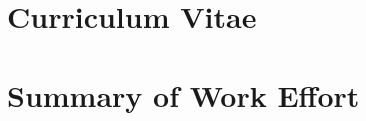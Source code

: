 \documentclass[12pt]{article}
\begin{document}


\newpage



\newpage
\section{Curriculum Vitae}
\label{sec:cv}

\newpage
\addtocounter{page}{8}
\section{Summary of Work Effort}
\label{sec:workeffort}
\end{document}
